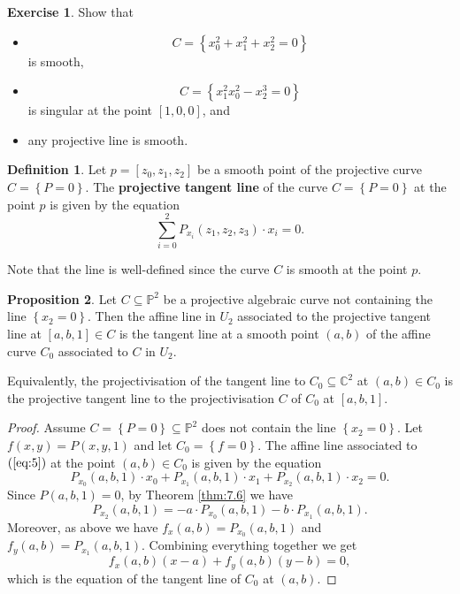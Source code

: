 \documentclass{article}
\newcommand{\C}{\mathbb{C}}
\renewcommand{\P}{\mathbb{P}}
\newcommand{\rb}[1]{\left( #1 \right)}
\renewcommand{\sb}[1]{\left[ #1 \right]}
\newcommand{\cb}[1]{\left\{ #1 \right\}}
\theoremstyle{definition}\newtheorem{definition}{Definition}[section]
\theoremstyle{definition}\newtheorem{notation}[definition]{Notation}
\theoremstyle{definition}\newtheorem{remark}[definition]{Remark}
\theoremstyle{definition}\newtheorem{example1}[definition]{Example}
\theoremstyle{definition}\newtheorem{fact}{Fact}
\theoremstyle{definition}\newtheorem{exercise}{Exercise}
\theoremstyle{definition}\newtheorem*{example2}{Example}
\newtheorem{proposition}[definition]{Proposition}
\begin{document}
\begin{exercise}
Show that
\begin{itemize}
\item
$$ C = \cb{x_0^2 + x_1^2 + x_2^2 = 0} $$
is smooth,
\item
$$ C = \cb{x_1^2x_0^2 - x_2^3 = 0} $$
is singular at the point $ \sb{1, 0, 0} $, and
\item any projective line is smooth.
\end{itemize}
\end{exercise}

\begin{definition}
Let $ p = \sb{z_0, z_1, z_2} $ be a smooth point of the projective curve $ C = \cb{P = 0} $. The \textbf{projective tangent line} of the curve $ C = \cb{P = 0} $ at the point $ p $ is given by the equation
\begin{equation}
\label{eq:5}
\sum_{i = 0}^2 P_{x_i}\rb{z_1, z_2, z_3} \cdot x_i = 0.
\end{equation}
\end{definition}

Note that the line is well-defined since the curve $ C $ is smooth at the point $ p $.

\begin{proposition}
Let $ C \subseteq \P^2 $ be a projective algebraic curve not containing the line $ \cb{x_2 = 0} $. Then the affine line in $ U_2 $ associated to the projective tangent line at $ \sb{a, b, 1} \in C $ is the tangent line at a smooth point $ \rb{a, b} $ of the affine curve $ C_0 $ associated to $ C $ in $ U_2 $.
\end{proposition}

Equivalently, the projectivisation of the tangent line to $ C_0 \subseteq \C^2 $ at $ \rb{a, b} \in C_0 $ is the projective tangent line to the projectivisation $ C $ of $ C_0 $ at $ \sb{a, b, 1} $.

\begin{proof}
Assume $ C = \cb{P = 0} \subseteq \P^2 $ does not contain the line $ \cb{x_2 = 0} $. Let $ f\rb{x, y} = P\rb{x, y, 1} $ and let $ C_0 = \cb{f = 0} $. The affine line associated to $ \rb{\ref{eq:5}} $ at the point $ \rb{a, b} \in C_0 $ is given by the equation
$$ P_{x_0}\rb{a, b, 1} \cdot x_0 + P_{x_1}\rb{a, b, 1} \cdot x_1 + P_{x_2}\rb{a, b, 1} \cdot x_2 = 0. $$
Since $ P\rb{a, b, 1} = 0 $, by Theorem \ref{thm:7.6} we have
$$ P_{x_2}\rb{a, b, 1} = -a \cdot P_{x_0}\rb{a, b, 1} - b \cdot P_{x_1}\rb{a, b, 1}. $$
Moreover, as above we have $ f_x\rb{a, b} = P_{x_0}\rb{a, b, 1} $ and $ f_y\rb{a, b} = P_{x_1}\rb{a, b, 1} $. Combining everything together we get
$$ f_x\rb{a, b}\rb{x - a} + f_y\rb{a, b}\rb{y - b} = 0, $$
which is the equation of the tangent line of $ C_0 $ at $ \rb{a, b} $.
\end{proof}
\end{document}
